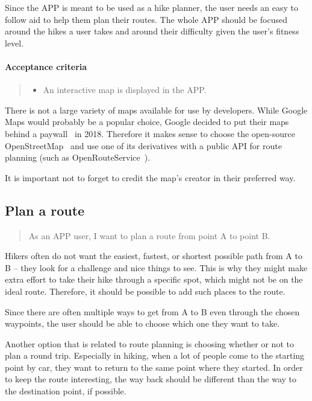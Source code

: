 Since the APP is meant to be used as a hike planner, the user needs an easy to follow aid to help them plan their routes.
The whole APP should be focused around the hikes a user takes and around their difficulty given the user's fitness level.

\paragraph*{Acceptance criteria}
\begin{quote}
\begin{itemize}
    \item An interactive map is displayed in the APP.
\end{itemize}
\end{quote}

There is not a large variety of maps available for use by developers.
While Google Maps would probably be a popular choice, Google decided to put their maps behind a paywall~\cite{google-maps-paywall} in 2018.
Therefore it makes sense to choose the open-source OpenStreetMap~\cite{OpenStreetMap} and use one of its derivatives with a public API for route planning (such as OpenRouteService~\cite{OpenRouteService}).

It is important not to forget to credit the map's creator in their preferred way.

\subsection{Plan a route}\label{US:map-plan}
\begin{quote}
As an APP user, I want to plan a route from point A to point B.
\end{quote}

Hikers often do not want the easiest, fastest, or shortest possible path from A to B -- they look for a challenge and nice things to see.
This is why they might make extra effort to take their hike through a specific spot, which might not be on the ideal route.
Therefore, it should be possible to add such places to the route.

Since there are often multiple ways to get from A to B even through the chosen waypoints, the user should be able to choose which one they want to take.

Another option that is related to route planning is choosing whether or not to plan a round trip.
Especially in hiking, when a lot of people come to the starting point by car, they want to return to the same point where they started.
In order to keep the route interesting, the way back should be different than the way to the destination point, if possible.

